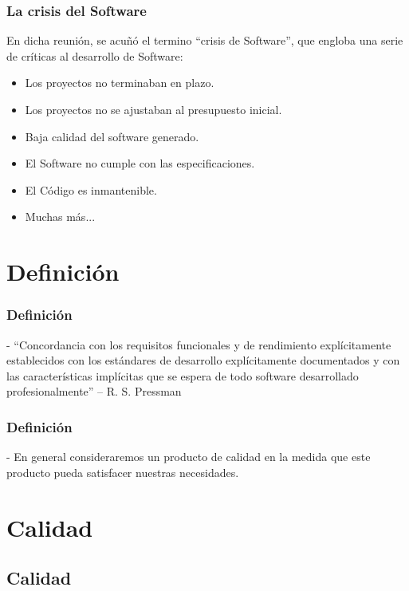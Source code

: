 \documentclass[12pt]{beamer}
\begin{document}
\begin{frame}
 \frametitle{La crisis del Software}
En dicha reunión, se acuñó el termino \alert{``crisis de Software''}, que engloba una serie de críticas al desarrollo de Software:
\begin{itemize}
 \item<2-> Los proyectos no terminaban en plazo.
 \item<3-> Los proyectos no se ajustaban al presupuesto inicial.
 \item<4-> \alert{Baja calidad} del software generado.
 \item<5-> El Software no cumple con las especificaciones.
 \item<6-> El Código es inmantenible.
 \item<7-> Muchas más...
\end{itemize}
\end{frame}






\section{Definición}

\begin{frame}
\frametitle{Definición}
\begin{block}
- ``Concordancia con los requisitos funcionales y de rendimiento explícitamente establecidos con los estándares de desarrollo 
explícitamente documentados y con las características implícitas que se espera de todo software desarrollado profesionalmente''
-- R. S. Pressman
\end{block}
\end{frame}

\begin{frame}
\frametitle{Definición}
\begin{block}
- En general consideraremos un producto de calidad en la medida que este producto pueda satisfacer nuestras necesidades.
\end{block}
\end{frame}

\section{Calidad}
\subsection{Calidad}
\end{document}

